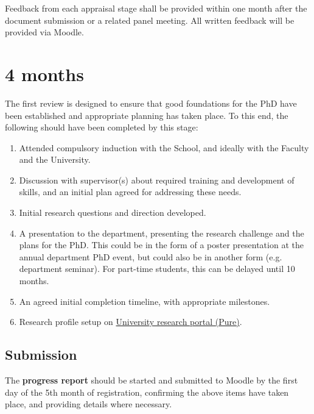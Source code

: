 \documentclass[12pt,a4paper]{article}
\begin{document}
Feedback from each appraisal stage shall be provided within one month after the document submission or a related panel meeting. All written feedback will be provided via Moodle.


\section{4 months}
The first review is designed to ensure that good foundations for the PhD have been established and appropriate planning has taken place. To this end, the following should have been completed by this stage:
\begin{enumerate}
\item Attended compulsory induction with the School, and ideally with the Faculty and the University.
\item Discussion with supervisor(s) about required training and development of skills, and an initial plan agreed for addressing these needs.
\item Initial research questions and direction developed.
\item A presentation to the department, presenting the research challenge and the plans for the PhD. This could be in the form of a poster presentation at the annual department PhD event, but could also be in another form (e.g. department seminar). For part-time students, this can be delayed until 10 months.
\item An agreed initial completion timeline, with appropriate milestones.
\item Research profile setup on \href{https://pure.lancs.ac.uk}{University research portal (Pure)}.
\end{enumerate}

\subsection{Submission}
The \textbf{progress report} should be started and submitted to Moodle by the first day of the 5th month of registration, confirming the above items have taken place, and providing details where necessary.
\end{document}
